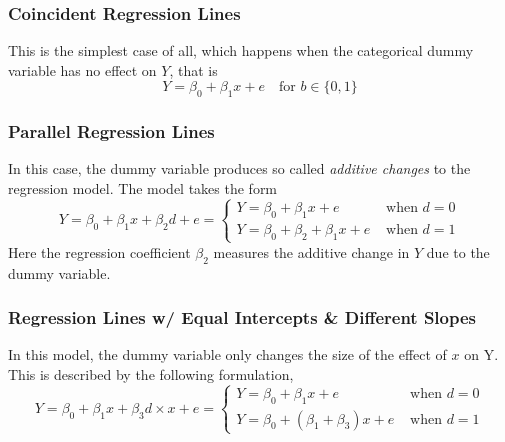 \documentclass[10pt]{article}
\begin{document}
\subsubsection{Coincident Regression Lines}
This is the simplest case of all, which happens when the categorical dummy variable has no effect on $Y$, that is
\begin{equation*}
    Y = \beta_0 + \beta_1 x + e \quad \text{for}\,\, b \in \{0, 1\}
\end{equation*}

\subsubsection{Parallel Regression Lines}
In this case, the dummy variable produces so called \textit{additive changes} to the regression model. The model takes the form
\begin{equation*}
    Y=\beta_{0}+\beta_{1} x+\beta_{2} d+e=\left\{\begin{array}{cc}{ Y=\beta_{0}+\beta_{1} x+e} & {\text { when } d=0} \\ {Y=\beta_{0}+\beta_{2}+\beta_{1} x+e} & {\text { when } d=1}\end{array}\right.
\end{equation*}
Here the regression coefficient $\beta_2$ measures the additive change in $Y$ due to the dummy variable. 

\subsubsection{Regression Lines w/ Equal Intercepts \& Different Slopes}
In this model, the dummy variable only changes the size of the effect of $x$ on Y. This is described by the following formulation,
\begin{equation*}
    Y=\beta_{0}+\beta_{1} x+\beta_{3} d \times x+e=\left\{\begin{array}{ll}{ Y=\beta_{0}+\beta_1 x+e} & {\text { when } d=0} \\ {Y=\beta_{0}+\left(\beta_{1}+\beta_{3}\right) x+e} & {\text { when } d=1}\end{array}\right.
\end{equation*}
\end{document}
